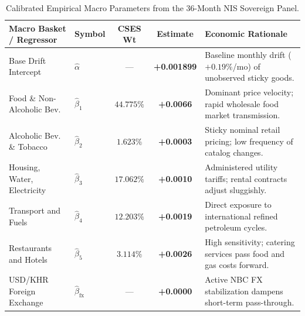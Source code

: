 \documentclass[a4paper, 11pt]{article}
\begin{document}
\begin{table}[H]
\centering
\small
\begin{tabularx}{\textwidth}{@{}llccX@{}}
\toprule
\textbf{Macro Basket / Regressor} & \textbf{Symbol} & \textbf{CSES Wt} & \textbf{Estimate} & \textbf{Economic Rationale} \\ \midrule
Base Drift Intercept & $\hat{\alpha}$ & --- & \textbf{+0.001899} & Baseline monthly drift ($+0.19\%$/mo) of unobserved sticky goods. \\
Food \& Non-Alcoholic Bev. & $\hat{\beta}_1$ & $44.775\%$ & \textbf{+0.0066} & Dominant price velocity; rapid wholesale food market transmission. \\
Alcoholic Bev. \& Tobacco & $\hat{\beta}_2$ & $1.623\%$ & \textbf{+0.0003} & Sticky nominal retail pricing; low frequency of catalog changes. \\
Housing, Water, Electricity & $\hat{\beta}_3$ & $17.062\%$ & \textbf{+0.0010} & Administered utility tariffs; rental contracts adjust sluggishly. \\
Transport and Fuels & $\hat{\beta}_4$ & $12.203\%$ & \textbf{+0.0019} & Direct exposure to international refined petroleum cycles. \\
Restaurants and Hotels & $\hat{\beta}_5$ & $3.114\%$ & \textbf{+0.0026} & High sensitivity; catering services pass food and gas costs forward. \\
USD/KHR Foreign Exchange & $\hat{\beta}_{\text{fx}}$ & --- & \textbf{+0.0000} & Active NBC FX stabilization dampens short-term pass-through. \\ \bottomrule
\end{tabularx}
\caption{Calibrated Empirical Macro Parameters from the 36-Month NIS Sovereign Panel.}
\label{tab:params}
\end{table}
\end{document}

